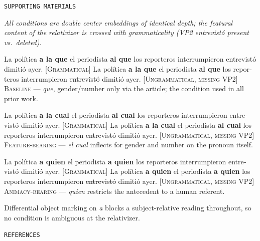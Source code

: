 \documentclass[12pt]{article}
\newcommand{\es}[1]{\foreignlanguage{spanish}{\textit{#1}}}
\newcommand{\rel}[1]{\textbf{#1}}
\newcommand{\smallcapshead}[1]{{\color{accent}\small\texttt{\MakeUppercase{#1}}}\par\vspace{2pt}{\color{muted}\hrule}\vspace{8pt}}
\begin{document}
\vspace{14pt}
\smallcapshead{Supporting materials}

\textit{All conditions are double center embeddings of identical depth; the featural content of the relativizer is crossed with grammaticality (VP2 \es{entrevistó} present vs.\ deleted).}

 \foreignlanguage{spanish}{La política \rel{a la que} el periodista \rel{al que} los reporteros interrumpieron entrevistó dimitió ayer.} {\color{muted}\small\textsc{[Grammatical]}}
 \ljudge{*} \foreignlanguage{spanish}{La política \rel{a la que} el periodista \rel{al que} los reporteros interrumpieron \sout{entrevistó} dimitió ayer.} {\color{muted}\small\textsc{[Ungrammatical, missing VP2]}}\\
{\color{muted}\small\textsc{Baseline} --- \es{que}, gender/number only via the article; the condition used in all prior work.}
\xe

 \foreignlanguage{spanish}{La política \rel{a la cual} el periodista \rel{al cual} los reporteros interrumpieron entrevistó dimitió ayer.} {\color{muted}\small\textsc{[Grammatical]}}
 \ljudge{*} \foreignlanguage{spanish}{La política \rel{a la cual} el periodista \rel{al cual} los reporteros interrumpieron \sout{entrevistó} dimitió ayer.} {\color{muted}\small\textsc{[Ungrammatical, missing VP2]}}\\
{\color{muted}\small\textsc{Feature-bearing} --- \es{el cual} inflects for gender and number on the pronoun itself.}
\xe

 \foreignlanguage{spanish}{La política \rel{a quien} el periodista \rel{a quien} los reporteros interrumpieron entrevistó dimitió ayer.} {\color{muted}\small\textsc{[Grammatical]}}
 \ljudge{*} \foreignlanguage{spanish}{La política \rel{a quien} el periodista \rel{a quien} los reporteros interrumpieron \sout{entrevistó} dimitió ayer.} {\color{muted}\small\textsc{[Ungrammatical, missing VP2]}}\\
{\color{muted}\small\textsc{Animacy-bearing} --- \es{quien} restricts the antecedent to a human referent.}
\xe

{\small Differential object marking on \es{a} blocks a subject-relative reading throughout, so no condition is ambiguous at the relativizer.\par}

\vspace{14pt}
\smallcapshead{References}

\nocite{*}
\printbibliography[heading=none]
\end{document}
